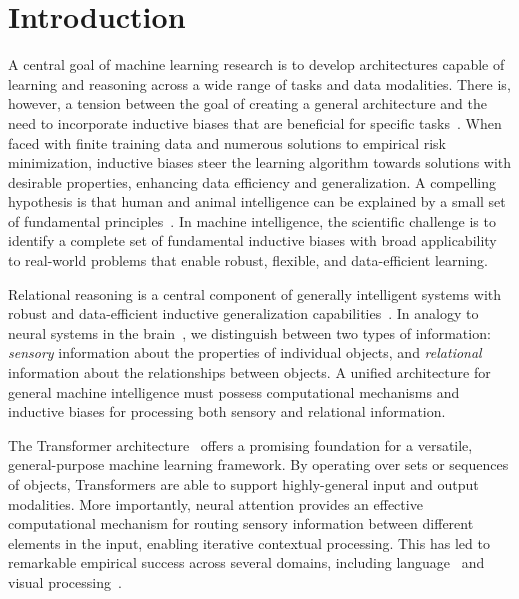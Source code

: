 \section{Introduction}\label{sec:intro}

A central goal of machine learning research is to develop  architectures capable of learning and reasoning across a wide range of tasks and data modalities. There is, however, a tension between the goal of creating a general architecture and the need to incorporate inductive biases that are beneficial for specific tasks~\citep{wolpert1995no,baxter2000model}. When faced with finite training data and numerous solutions to empirical risk minimization, inductive biases steer the learning algorithm towards solutions with desirable properties, enhancing data efficiency and generalization. A compelling hypothesis is that human and animal intelligence can be explained by a small set of fundamental principles~\citep{marcus2003algebraic}. In machine intelligence, the scientific challenge is to identify a complete set of fundamental inductive biases with broad applicability to real-world problems that enable robust, flexible, and data-efficient learning.

Relational reasoning is a central component of generally intelligent systems with robust and data-efficient inductive generalization capabilities~\citep{kemp2008discovery}. In analogy to neural systems in the brain~\citep{newman1997neural}, we distinguish between two types of information: \textit{sensory} information about the properties of individual objects, and \textit{relational} information about the relationships between objects. A unified architecture for general machine intelligence must possess computational mechanisms and inductive biases for processing both sensory and relational information.

The Transformer architecture~\citep{vaswani2017attention} offers a promising foundation for a versatile, general-purpose machine learning framework. By operating over sets or sequences of objects, Transformers are able to support highly-general input and output modalities. More importantly, neural attention provides an effective computational mechanism for routing sensory information between different elements in the input, enabling iterative contextual processing. This has led to remarkable empirical success across several domains, including language~\citep{kaplan2020scalinglawsneurallanguage} and visual processing~\citep{dosovitskiyImageWorth16x162020}.

